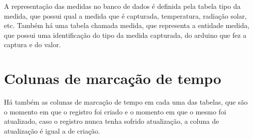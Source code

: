 A representação das medidas no banco de dados é definida pela tabela tipo da medida, que possui qual a medida que é capturada, temperatura, radiação solar, etc.
Também há uma tabela chamada medida, que representa a entidade medida, que possui uma identificação do tipo da medida capturada, do arduino que fez a captura e do valor.

\section{Colunas de marcação de tempo}

Há também as colunas de marcação de tempo em cada uma das tabelas, que são o momento em que o registro foi criado e o momento em que o mesmo foi atualizado, caso o registro nunca tenha sofrido atualização, a coluna de atualização é igual a de criação.
